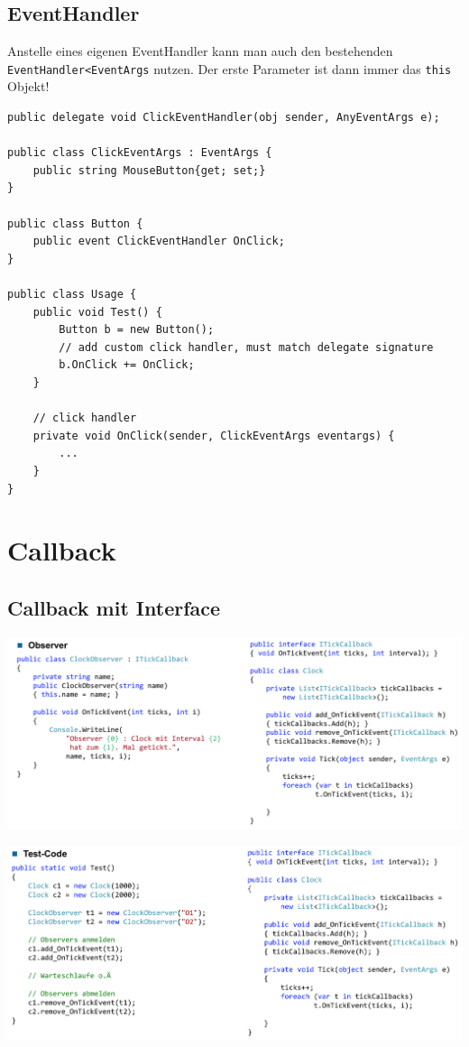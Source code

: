 \documentclass[
a4paper,
oneside,
10pt,
fleqn,
headsepline,
toc=listofnumbered, 
bibliography=totocnumbered]{scrartcl}
\let\stdsection\section
\renewcommand\section{\clearpage\stdsection}
\begin{document}
\subsection{EventHandler}
Anstelle eines eigenen EventHandler kann man auch den bestehenden \lstinline|EventHandler<EventArgs| nutzen. Der erste Parameter ist dann immer das \lstinline|this| Objekt!
\begin{lstlisting}[caption=C\# Event Handler]
public delegate void ClickEventHandler(obj sender, AnyEventArgs e);

public class ClickEventArgs : EventArgs {
	public string MouseButton{get; set;}
}

public class Button {
	public event ClickEventHandler OnClick;
}

public class Usage {
	public void Test() {
		Button b = new Button();
		// add custom click handler, must match delegate signature
		b.OnClick += OnClick;
	}
	
	// click handler
	private void OnClick(sender, ClickEventArgs eventargs) {
		...
	}
}
\end{lstlisting}

\section{Callback}

\subsection{Callback mit Interface}

\includegraphics[scale=0.3]{images/callback_interface}

\includegraphics[scale=0.3]{images/callback_interface_test}
\end{document}

